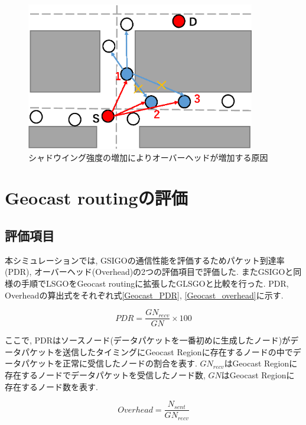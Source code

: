\documentclass[10pt]{jreport}
\begin{document}
\begin{figure}[!ht]
	\centering
	\includegraphics[width=100mm]{figures/dif_roadsegment_overhead_reason.eps}
	\caption{シャドウイング強度の増加によりオーバーヘッドが増加する原因}
	\label{fig:dif_roadsegment_overhead_reason}
\end{figure}




\section{Geocast routingの評価}
\label{Geocast_evaluation}


\subsection{評価項目}
\label{geocast_evaluation_item}
本シミュレーションでは, GSIGOの通信性能を評価するためパケット到達率(PDR), オーバーヘッド(Overhead)の2つの評価項目で評価した. またGSIGOと同様の手順でLSGOをGeocast routingに拡張したGLSGOと比較を行った. PDR, Overheadの算出式をそれぞれ式\ref{Geocast_PDR}, \ref{Geocast_overhead}に示す.

\begin{equation}
	\label{Geocast_PDR}
	PDR = \frac{GN_{recv}}{  GN  } \times 100
\end{equation}

ここで, PDRはソースノード(データパケットを一番初めに生成したノード)がデータパケットを送信したタイミングにGeocast Regionに存在するノードの中でデータパケットを正常に受信したノードの割合を表す. $GN_{recv}$はGeocast Regionに存在するノードでデータパケットを受信したノード数, $GN$はGeocast Regionに存在するノード数を表す. 

\begin{equation}
	\label{Geocast_overhead}
	Overhead =  \frac{  N_{sent}  }{GN_{recv}}
\end{equation}
\end{document}
